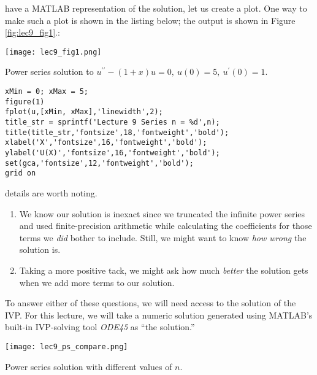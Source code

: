  have a MATLAB representation of the solution, let us create a plot.  One way to make such a plot is shown in the listing below; the output is shown in Figure \ref{fig:lec9_fig1}.:
\begin{marginfigure}
\texttt{[image: lec9\_fig1.png]}
\caption{Power series solution to $u^{\prime \prime}-(1+x)u=0, \ u(0)=5,\ u^{\prime}(0)=1$.}
\label{fig:lec9_fig1}
\end{marginfigure}
\begin{lstlisting}[name=lec9_ex1,style=myMatlab]
xMin = 0; xMax = 5;
figure(1)
fplot(u,[xMin, xMax],'linewidth',2);
title_str = sprintf('Lecture 9 Series n = %d',n);
title(title_str,'fontsize',18,'fontweight','bold');
xlabel('X','fontsize',16,'fontweight','bold');
ylabel('U(X)','fontsize',16,'fontweight','bold');
set(gca,'fontsize',12,'fontweight','bold');
grid on
\end{lstlisting}
 details are worth noting.  
\begin{enumerate}
\item We know our solution is inexact since we truncated the infinite power series and used finite-precision arithmetic while calculating the coefficients for those terms we \emph{did} bother to include.  Still, we might want to know \emph{how wrong} the solution is.
\item Taking a more positive tack, we might ask how much \emph{better} the solution gets when we add more terms to our solution.
\end{enumerate}
To answer either of these questions, we will need access to the solution of the IVP.  For this lecture, we will take a numeric solution generated using MATLAB's built-in IVP-solving tool \emph{ODE45} as ``the solution.''
\begin{marginfigure}
\texttt{[image: lec9\_ps\_compare.png]}
\caption{Power series solution with different values of $n$.}
\label{fig:lec9_ps_compare}
\end{marginfigure}

